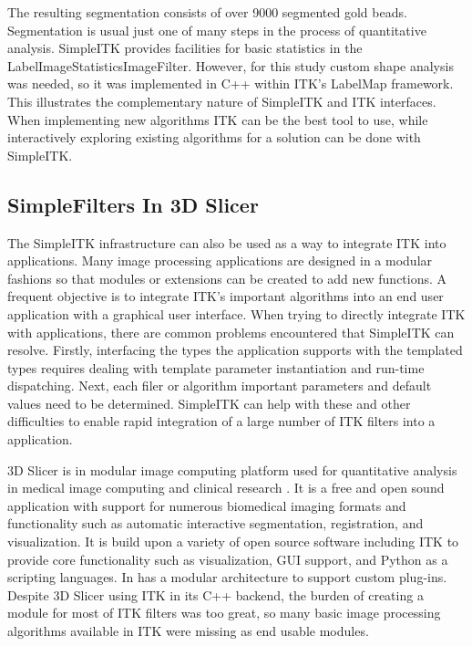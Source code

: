 \documentclass{frontiersMED} %
\begin{document}


The resulting segmentation consists of over 9000 segmented gold
beads. Segmentation is usual just one of many steps in the process of
quantitative analysis. SimpleITK provides facilities for basic
statistics in the LabelImageStatisticsImageFilter. However, for this
study custom shape analysis was needed, so it was implemented in C++
within ITK’s LabelMap framework. This illustrates the complementary
nature of SimpleITK and ITK interfaces. When implementing new
algorithms ITK can be the best tool to use, while interactively
exploring existing algorithms for a solution can be done with
SimpleITK. 

\subsection{SimpleFilters In 3D Slicer}
The SimpleITK infrastructure can also be used as a way to integrate
ITK into applications. Many image processing applications are designed
in a modular fashions so that modules or extensions can be created to
add new functions. A frequent objective is to integrate ITK’s
important algorithms into an end user application with a graphical
user interface. When trying to directly integrate ITK with
applications, there are common problems encountered that SimpleITK can
resolve.  Firstly, interfacing the types the application supports with
the templated types requires dealing with template parameter
instantiation and run-time dispatching. Next, each filer or algorithm
important parameters and default values need to be
determined. SimpleITK can help with these and other difficulties to
enable rapid integration of a large number of ITK filters into a
application. 

3D Slicer is in modular image computing platform used for quantitative
analysis in medical image computing and clinical research
\cite{Fedorov2012}. It is a free and open sound application with support
for numerous biomedical imaging formats and functionality such as
automatic interactive segmentation, registration, and
visualization. It is build upon a variety of open source software
including ITK to provide core functionality such as visualization, GUI
support, and Python as a scripting languages. In has a modular
architecture to support custom plug-ins. Despite 3D Slicer using ITK
in its C++ backend, the burden of creating a module for most of ITK
filters was too great, so many basic image processing algorithms
available in ITK were missing as end usable modules.
\end{document}
